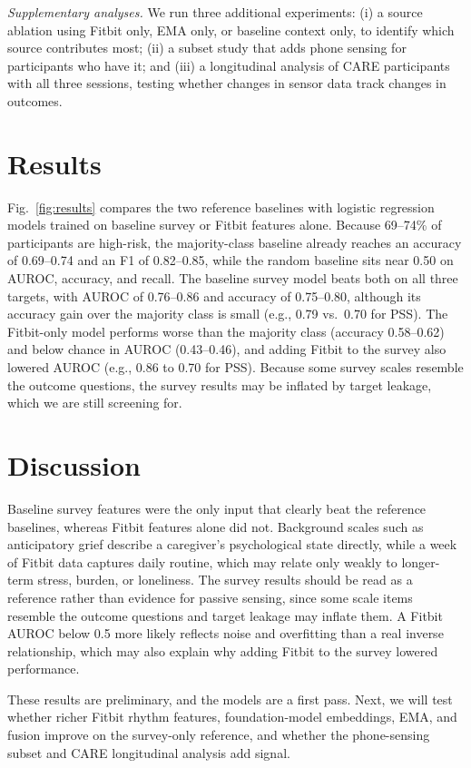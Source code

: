 \documentclass[letterpaper, 10 pt, conference]{ieeeconf}  %
\begin{document}
\textit{Supplementary analyses.} We run three additional experiments: (i) a source ablation using Fitbit only, EMA only, or baseline context only, to identify which source contributes most; (ii) a subset study that adds phone sensing for participants who have it; and (iii) a longitudinal analysis of CARE participants with all three sessions, testing whether changes in sensor data track changes in outcomes.

\section{Results}

Fig.~\ref{fig:results} compares the two reference baselines with logistic regression models trained on baseline survey or Fitbit features alone. Because 69--74\% of participants are high-risk, the majority-class baseline already reaches an accuracy of 0.69--0.74 and an F1 of 0.82--0.85, while the random baseline sits near 0.50 on AUROC, accuracy, and recall. The baseline survey model beats both on all three targets, with AUROC of 0.76--0.86 and accuracy of 0.75--0.80, although its accuracy gain over the majority class is small (e.g., 0.79 vs.\ 0.70 for PSS). The Fitbit-only model performs worse than the majority class (accuracy 0.58--0.62) and below chance in AUROC (0.43--0.46), and adding Fitbit to the survey also lowered AUROC (e.g., 0.86 to 0.70 for PSS). Because some survey scales resemble the outcome questions, the survey results may be inflated by target leakage, which we are still screening for.


\section{Discussion}
Baseline survey features were the only input that clearly beat the reference baselines, whereas Fitbit features alone did not. Background scales such as anticipatory grief describe a caregiver's psychological state directly, while a week of Fitbit data captures daily routine, which may relate only weakly to longer-term stress, burden, or loneliness. The survey results should be read as a reference rather than evidence for passive sensing, since some scale items resemble the outcome questions and target leakage may inflate them. A Fitbit AUROC below 0.5 more likely reflects noise and overfitting than a real inverse relationship, which may also explain why adding Fitbit to the survey lowered performance.

These results are preliminary, and the models are a first pass. Next, we will test whether richer Fitbit rhythm features, foundation-model embeddings, EMA, and fusion improve on the survey-only reference, and whether the phone-sensing subset and CARE longitudinal analysis add signal.
\end{document}
